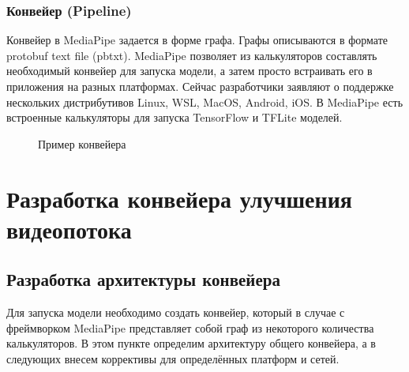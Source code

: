 \documentclass[a4paper,14pt]{extreport}
\begin{document}
        \subsection{Конвейер (Pipeline)}
        Конвейер в MediaPipe задается в форме графа. Графы описываются в формате protobuf text file (pbtxt). MediaPipe позволяет из калькуляторов составлять необходимый конвейер для запуска модели, а затем просто встраивать его в приложения на разных платформах. Сейчас разработчики заявляют о поддержке нескольких дистрибутивов Linux, WSL, MacOS, Android, iOS. В MediaPipe есть встроенные калькуляторы для запуска TensorFlow и TFLite моделей.
        \begin{figure}[h]
            \caption{Пример конвейера}
            \label{ris:subgraph}
        \end{figure}

    \chapter{Разработка конвейера улучшения видеопотока}
        \section{Разработка архитектуры конвейера}
        Для запуска модели необходимо создать конвейер, который в случае с фреймворком MediaPipe представляет собой граф из некоторого количества калькуляторов. В этом пункте определим архитектуру общего конвейера, а в следующих внесем коррективы для определённых платформ и сетей.
\end{document}

